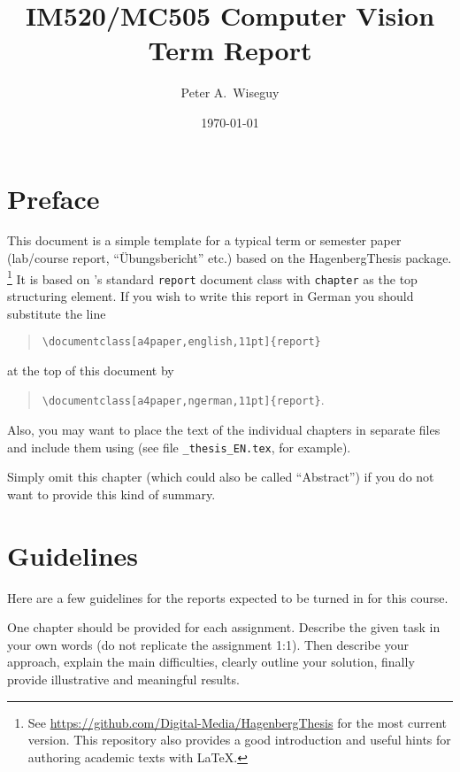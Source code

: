 \documentclass[a4paper,english,11pt]{report}
\author{Peter A.\ Wiseguy}
\title{IM520/MC505 Computer Vision\\ Term Report}
\date{\today}
\begin{document}
\maketitle
\tableofcontents

\chapter*{Preface} %

This document is a simple template for a typical term or semester paper (lab/course report, 
``Übungsbericht'' etc.) based on the \textsf{HagenbergThesis} \latex package.%
\footnote{See \url{https://github.com/Digital-Media/HagenbergThesis} for the most current version.
This repository also provides a good introduction and useful hints for authoring academic texts with LaTeX.}
It is based on \latex's standard \texttt{report} document class with \texttt{chapter} as the top 
structuring element.
If you wish to write this report in German you should substitute the line
\begin{quote}
 \verb!\documentclass[a4paper,english,11pt]{report}! 
\end{quote}
at the top of this document by
\begin{quote}
 \verb!\documentclass[a4paper,ngerman,11pt]{report}!.
\end{quote}
Also, you may want to place the text of the individual chapters in separate files and 
include them using \verb!! 
(see file \nolinkurl{_thesis_EN.tex}, for example).

Simply omit this chapter (which could also be called ``Abstract'') if you do not want to provide this kind of summary.


\chapter{Guidelines}

Here are a few guidelines for the reports expected to be turned in for this course.

One chapter should be provided for each assignment.
Describe the given task in your own words (do not replicate the assignment 1:1). 
Then describe your approach, explain the main difficulties, clearly outline your solution, finally provide illustrative and meaningful results. 
\end{document}
